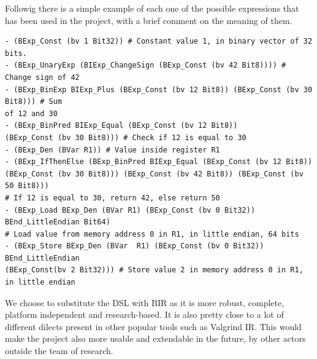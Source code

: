 Followig there is a simple example of each one of the possible expressions that
has been used in the project, with a brief comment on the meaning of them.
\begin{verbatim}
- (BExp_Const (bv 1 Bit32)) # Constant value 1, in binary vector of 32 bits.
- (BExp_UnaryExp (BIExp_ChangeSign (BExp_Const (bv 42 Bit8)))) # Change sign of 42
- (BExp_BinExp BIExp_Plus (BExp_Const (bv 12 Bit8)) (BExp_Const (bv 30 Bit8))) # Sum
of 12 and 30
- (BExp_BinPred BIExp_Equal (BExp_Const (bv 12 Bit8)) 
(BExp_Const (bv 30 Bit8))) # Check if 12 is equal to 30
- (BExp_Den (BVar R1)) # Value inside register R1
- (BExp_IfThenElse (BExp_BinPred BIExp_Equal (BExp_Const (bv 12 Bit8)) 
(BExp_Const (bv 30 Bit8))) (BExp_Const (bv 42 Bit8)) (BExp_Const (bv 50 Bit8))) 
# If 12 is equal to 30, return 42, else return 50
- (BExp_Load BExp_Den (BVar R1) (BExp_Const (bv 0 Bit32)) BEnd_LittleEndian Bit64) 
# Load value from memory address 0 in R1, in little endian, 64 bits
- (BExp_Store BExp_Den (BVar  R1) (BExp_Const (bv 0 Bit32)) BEnd_LittleEndian 
(BExp_Const(bv 2 Bit32))) # Store value 2 in memory address 0 in R1, in little endian
\end{verbatim}

We choose to substitute the DSL with BIR as it is more robust, complete, platform
independent and research-based. It is also pretty close to a lot of different
dilects present in other popular tools such as Valgrind IR. This would make the project
also more usable and extendable in the future, by other actors outside the team
of research.